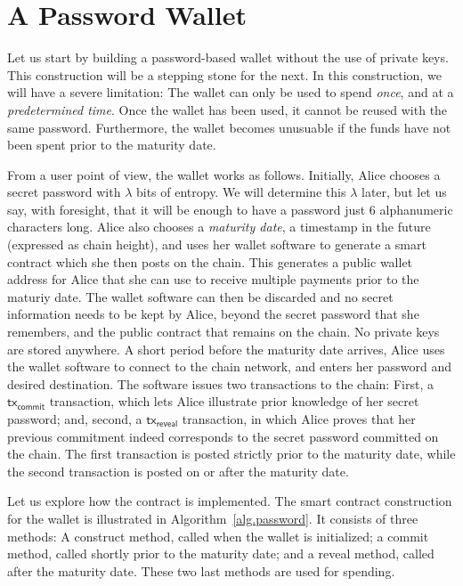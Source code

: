 \section{A Password Wallet}

Let us start by building a password-based wallet without the use of private keys.
This construction will be a stepping stone for the next. In this construction, we
will have a severe limitation: The wallet can only be used to spend \emph{once},
and at a \emph{predetermined time}. Once the wallet has been used, it cannot be
reused with the same password. Furthermore, the wallet becomes unusuable if the
funds have not been spent prior to the maturity date.

From a user point of view, the wallet works as follows. Initially, Alice chooses
a secret password with $\lambda$ bits of entropy. We will determine this $\lambda$
later, but let us say, with foresight, that it will be enough to have a password
just $6$ alphanumeric characters long. Alice also chooses a \emph{maturity date},
a timestamp in the future (expressed as chain height),
and uses her wallet software to generate
a smart contract which she then posts on the chain. This generates a public wallet
address for Alice that she can use to receive multiple payments prior to the maturiy date.
The wallet software can then
be discarded and no secret information needs to be kept by Alice, beyond the
secret password that she remembers, and the public contract that remains on the chain.
No private keys are stored anywhere.
A short period before the maturity date arrives,
Alice uses the wallet software to connect to the chain network, and enters her
password and desired destination. The software issues two transactions to the chain:
First, a $\textsf{tx}_\textsf{commit}$ transaction, which lets Alice illustrate prior
knowledge of her secret password; and, second, a $\textsf{tx}_\textsf{reveal}$ transaction,
in which Alice proves that her previous commitment indeed corresponds to the secret
password committed on the chain. The first transaction is posted strictly prior to the maturity
date, while the second transaction is posted on or after the maturity date.

Let us explore how the contract is implemented.
The smart contract construction for the wallet is illustrated in
Algorithm~\ref{alg.password}. It consists of three methods: A \textsf{construct}
method, called when the wallet is initialized; a \textsf{commit} method, called
shortly prior to the maturity date; and a \textsf{reveal} method, called after
the maturity date. These two last methods are used for spending.

